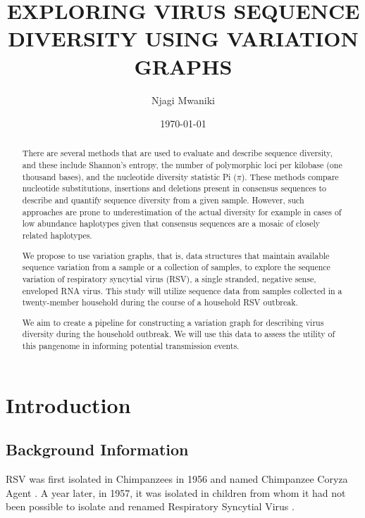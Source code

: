 \documentclass[11pt]{article}
\author{Njagi Mwaniki}
\date{\today}
\title{EXPLORING VIRUS SEQUENCE DIVERSITY USING VARIATION GRAPHS}
\begin{document}
\maketitle
\newcommand{\bigO}{\mathcal{O}}

\newpage
\newpage
\begin{abstract}
There are several methods that are used to evaluate and describe sequence
diversity, and these include Shannon's entropy, the number of polymorphic loci
per kilobase (one thousand bases), and the nucleotide diversity statistic Pi
($\pi$).
These methods compare nucleotide substitutions, insertions and deletions
present  in consensus sequences to describe and quantify sequence diversity
from a given sample.
However, such approaches are prone to underestimation of the actual
diversity for example in cases of low abundance haplotypes given that consensus
sequences are a mosaic of closely related haplotypes.

We propose to use variation graphs, that is, data structures that maintain
available sequence variation from a sample or a collection of samples, to
explore the sequence variation of respiratory syncytial virus (RSV), a single
stranded, negative sense, enveloped RNA virus. This study will utilize sequence
data from samples collected in a twenty-member household during the course of a
household RSV outbreak.

We aim to create a pipeline for constructing a variation graph for describing
virus diversity during the household outbreak. We will use this data to assess
the utility of this pangenome in informing potential transmission events.
\end{abstract}

\newpage
\tableofcontents

\listoffigures

\newpage

\section{Introduction}
\label{sec:org1b33860}
\subsection{Background Information}
\label{sec:orge9e5602}

RSV was first isolated in Chimpanzees in 1956 and named Chimpanzee Coryza Agent
\cite{morrisRecoveryCytopathogenicAgent1956}. 
A year later, in 1957, it was isolated in children from
whom it had not been possible to isolate and renamed Respiratory Syncytial
Virus \cite{beemAssociationChimpanzeeCoryza1960,chanockRecoveryInfantsRespiratory1957,zlatevaGeneticVariabilityMolecular2005}.
\end{document}
